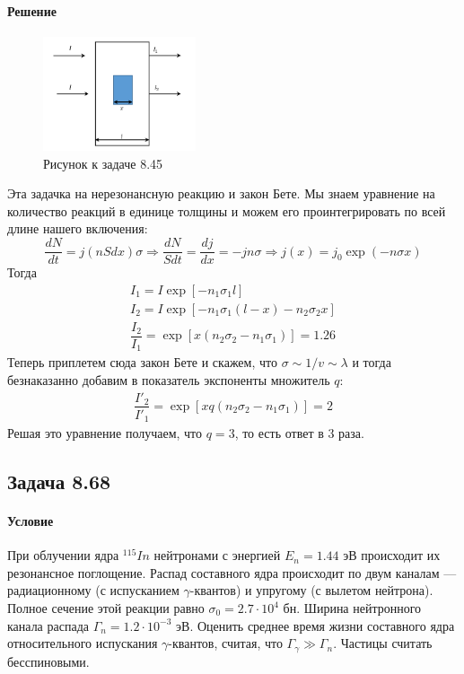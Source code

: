 \documentclass[12pt]{article}
\begin{document}
\paragraph{Решение}
\begin{figure}[h]
    \centering
    \includegraphics[width=0.4\textwidth,height=\textheight,keepaspectratio]{Seminar_10/pics/pic_03_8_45.pdf}
    \caption{Рисунок к задаче 8.45}
\end{figure}
Эта задачка на нерезонансную реакцию и закон Бете. Мы знаем уравнение на количество реакций в единице толщины и можем его проинтегрировать по всей длине нашего включения:
\begin{equation*}
    \dfrac{dN}{dt} = j (nSdx) \sigma \Rightarrow \dfrac{dN}{Sdt} = \dfrac{dj}{dx}= - j n \sigma \Rightarrow j(x) = j_0 \exp{(-n\sigma x)}
\end{equation*}
Тогда 
\begin{gather*}
    I_1 = I \exp{[-n_1\sigma_1 l]}\\
    I_2 = I \exp{[-n_1\sigma_1 (l-x)-n_2\sigma_2 x]}\\
    \dfrac{I_2}{I_1} = \exp{[x(n_2\sigma_2 - n_1\sigma_1)]} = 1.26
\end{gather*}
Теперь приплетем сюда закон Бете и скажем, что $\sigma \sim 1/v \sim \lambda$ и тогда безнаказанно добавим в показатель экспоненты множитель $q$:
\begin{gather*}
    \dfrac{I'_2}{I'_1} = \exp{[xq(n_2\sigma_2 - n_1\sigma_1)]} = 2
\end{gather*}
Решая это уравнение получаем, что $q = 3$, то есть ответ в 3 раза.

\subsection{Задача 8.68}
\paragraph{Условие}
При облучении ядра $^{115}In$ нейтронами с энергией $E_n = 1.44$ эВ происходит их резонансное поглощение. Распад составного ядра происходит по двум каналам --- радиационному (с испусканием $\gamma$-квантов) и упругому (с вылетом нейтрона). Полное сечение этой реакции равно $\sigma_0 = 2.7 \cdot 10^4$ бн. Ширина нейтронного канала распада $\Gamma_n = 1.2 \cdot 10^{−3}$ эВ. Оценить среднее время жизни составного ядра относительного испускания $\gamma$-квантов,
считая, что $\Gamma_{\gamma} \gg \Gamma_n$. Частицы считать бесспиновыми.
\end{document}
